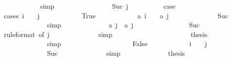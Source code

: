 \begin{isabellebody}
\ \ \ \ \ \ \ \ \ \ \isamarkupfalse%
\ simp\isanewline
\ \ \ \ \ \ \isamarkupfalse%
\isanewline
\ \ \ \ \ \ \ \ \isamarkupfalse%
\ {\isacharparenleft}Suc\ j{\isacharparenright}\isanewline
\ \ \ \ \ \ \ \ \isamarkupfalse%
\ {\isacharquery}case\isanewline
\ \ \ \ \ \ \ \ \isamarkupfalse%
\ {\isacharparenleft}cases\ {\isachardoublequoteopen}i\ {\isacharplus}\ {}\ {\isacharless}\ j{\isachardoublequoteclose}{\isacharparenright}\isanewline
\ \ \ \ \ \ \ \ \ \ \isamarkupfalse%
\ True\isanewline
\ \ \ \ \ \ \ \ \ \ \isamarkupfalse%
\ {\isachardoublequoteopen}{\isacharquery}a\ {\isacharparenleft}i\ {\isacharplus}\ {}{\isacharparenright}\ {\isacharless}\ {\isacharquery}a\ j{\isachardoublequoteclose}\isanewline
\ \ \ \ \ \ \ \ \ \ \ \ \isamarkupfalse%
\ Suc\isanewline
\ \ \ \ \ \ \ \ \ \ \ \ \isamarkupfalse%
\ simp\isanewline
\ \ \ \ \ \ \ \ \ \ \isamarkupfalse%
\ \isamarkupfalse%
\ {\isachardoublequoteopen}{\isacharquery}a\ j\ {\isacharless}\ {\isacharquery}a\ {\isacharparenleft}j\ {\isacharplus}\ {}{\isacharparenright}{\isachardoublequoteclose}\isanewline
\ \ \ \ \ \ \ \ \ \ \ \ \isamarkupfalse%
\ Suc{\isacharparenleft}{}{\isacharparenright}\isanewline
\ \ \ \ \ \ \ \ \ \ \ \ \isamarkupfalse%
\ {\isacharasterisk}{\isacharbrackleft}rule{\isacharunderscore}format{\isacharcomma}\ of\ {\isachardoublequoteopen}j{\isacharminus}{}{\isachardoublequoteclose}{\isacharbrackright}\isanewline
\ \ \ \ \ \ \ \ \ \ \ \ \isamarkupfalse%
\ simp\isanewline
\ \ \ \ \ \ \ \ \ \ \isamarkupfalse%
\isanewline
\ \ \ \ \ \ \ \ \ \ \isamarkupfalse%
\ {\isacharquery}thesis\isanewline
\ \ \ \ \ \ \ \ \ \ \ \ \isamarkupfalse%
\ simp\isanewline
\ \ \ \ \ \ \ \ \isamarkupfalse%
\isanewline
\ \ \ \ \ \ \ \ \ \ \isamarkupfalse%
\ False\isanewline
\ \ \ \ \ \ \ \ \ \ \isamarkupfalse%
\ {\isachardoublequoteopen}i\ {\isacharplus}\ {}\ {\isacharequal}\ j{\isachardoublequoteclose}\isanewline
\ \ \ \ \ \ \ \ \ \ \ \ \isamarkupfalse%
\ Suc{\isacharparenleft}{}{\isacharparenright}\isanewline
\ \ \ \ \ \ \ \ \ \ \ \ \isamarkupfalse%
\ simp\isanewline
\ \ \ \ \ \ \ \ \ \ \isamarkupfalse%
\ \isamarkupfalse%
\ {\isacharquery}thesis\isanewline

\end{isabellebody}
